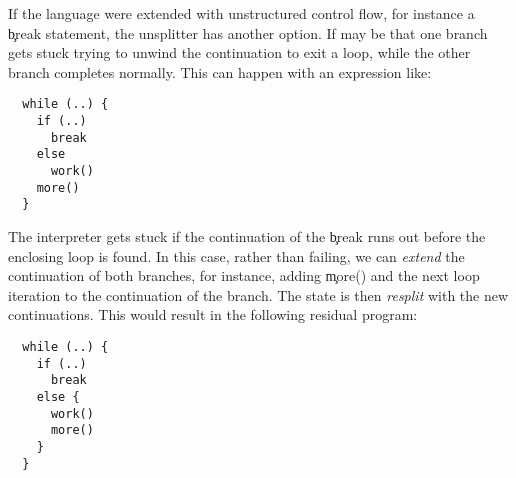 If the language were extended with unstructured control flow, for instance a
\c{break} statement, the unsplitter has another option.
If may be that one branch gets stuck trying to unwind the continuation
to exit a loop, while the other branch completes normally. This can happen
with an expression like:
\begin{verbatim}
  while (..) {
    if (..)
      break
    else
      work()
    more()
  }
\end{verbatim}
The interpreter gets stuck if the continuation of the \c{break} runs out before
the enclosing loop is found.
In this case, rather than failing, we can \emph{extend} the continuation of
both branches, for instance, adding \c{more()} and the next loop iteration
to the continuation of the branch. The state is then \emph{resplit} with the
new continuations. This would result in the following residual program:
\begin{verbatim}
  while (..) {
    if (..)
      break
    else {
      work()
      more()
    }
  }
\end{verbatim}

